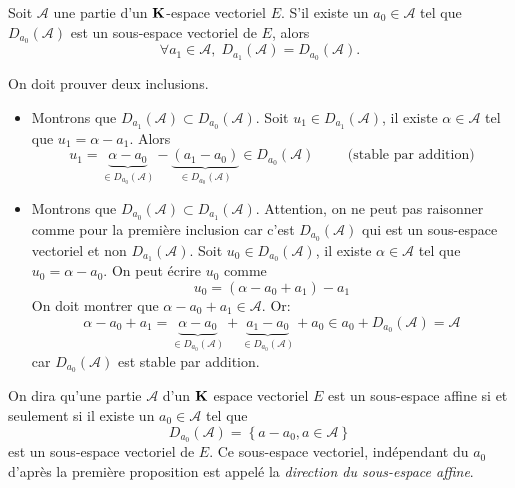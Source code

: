 \begin{prop}
 Soit $\mathcal A$ une partie d'un $\mathbf{K}$-espace vectoriel $E$. S'il existe un $a_0\in\mathcal A$ tel que $D_{a_0}(\mathcal{A})$ est un sous-espace vectoriel de $E$, alors
\[
 \forall a_1 \in \mathcal A, \; D_{a_1}(\mathcal{A}) = D_{a_0}(\mathcal{A}).
\]
\end{prop}
\begin{demo}
 On doit prouver deux inclusions.
\begin{itemize}
 \item Montrons que $D_{a_1}(\mathcal{A})\subset D_{a_0}(\mathcal{A})$. Soit $u_1\in D_{a_1}(\mathcal{A})$, il existe $\alpha\in \mathcal{A}$ tel que $u_1=\alpha - a_1$. Alors
\begin{displaymath}
 u_1 = \underset{\in D_{a_0}(\mathcal{A})}{\underbrace{\alpha - a_0}} -\underset{\in D_{a_0}(\mathcal{A})}{\underbrace{(a_1-a_0)}} \in D_{a_0}(\mathcal{A}) \hspace{1cm}\text{(stable par addition)}
\end{displaymath}
 \item Montrons que $D_{a_0}(\mathcal{A})\subset D_{a_1}(\mathcal{A})$. Attention, on ne peut pas raisonner comme pour la première inclusion car c'est $D_{a_0}(\mathcal{A})$ qui est un sous-espace vectoriel et non $D_{a_1}(\mathcal{A})$.\newline
Soit $u_0\in D_{a_0}(\mathcal{A})$, il existe $\alpha\in \mathcal{A}$ tel que $u_0=\alpha - a_0$. On peut écrire $u_0$ comme
\begin{displaymath}
 u_0 = (\alpha -a_0 + a_1) -a_1 
\end{displaymath}
On doit montrer que $\alpha -a_0 + a_1 \in \mathcal{A}$. Or:
\begin{displaymath}
\alpha -a_0 + a_1 = \underset{\in D_{a_0}(\mathcal{A})}{\underbrace{\alpha - a_0}} + \underset{\in D_{a_0}(\mathcal{A})}{\underbrace{a_1 - a_0}} + a_0 \in a_0 + D_{a_0}(\mathcal{A}) = \mathcal{A}
\end{displaymath}
car $D_{a_0}(\mathcal{A})$ est stable par addition.
\end{itemize}
\end{demo}
\begin{defi}
 On dira qu'une partie $\mathcal A$ d'un $\mathbf{K}$ espace vectoriel $E$ est un sous-espace affine  si et seulement si il existe un $a_0\in\mathcal A$ tel que 
\begin{displaymath}
 D_{a_0}(\mathcal{A}) = \left\lbrace a-a_0, a\in \mathcal A\right\rbrace 
\end{displaymath}
est un sous-espace vectoriel de $E$. Ce sous-espace vectoriel, indépendant du $a_0$ d'après la première proposition est appelé la \emph{direction du sous-espace affine}.
\end{defi}
